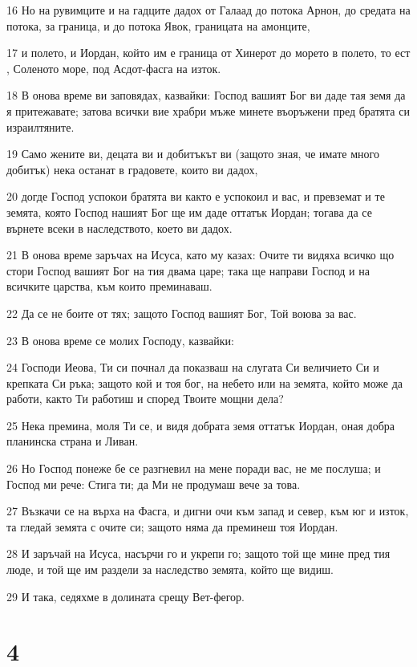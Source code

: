 \par 16 Но на рувимците и на гадците дадох от Галаад до потока Арнон, до средата на потока, за граница, и до потока Явок, границата на амонците,
\par 17 и полето, и Иордан, който им е граница от Хинерот до морето в полето, то ест , Соленото море, под Асдот-фасга на изток.
\par 18 В онова време ви заповядах, казвайки: Господ вашият Бог ви даде тая земя да я притежавате; затова всички вие храбри мъже минете въоръжени пред братята си израилтяните.
\par 19 Само жените ви, децата ви и добитъкът ви (защото зная, че имате много добитък) нека останат в градовете, които ви дадох,
\par 20 догде Господ успокои братята ви както е успокоил и вас, и превземат и те земята, която Господ нашият Бог ще им даде оттатък Иордан; тогава да се върнете всеки в наследството, което ви дадох.
\par 21 В онова време заръчах на Исуса, като му казах: Очите ти видяха всичко що стори Господ вашият Бог на тия двама царе; така ще направи Господ и на всичките царства, към които преминаваш.
\par 22 Да се не боите от тях; защото Господ вашият Бог, Той воюва за вас.
\par 23 В онова време се молих Господу, казвайки:
\par 24 Господи Иеова, Ти си почнал да показваш на слугата Си величието Си и крепката Си ръка; защото кой и тоя бог, на небето или на земята, който може да работи, както Ти работиш и според Твоите мощни дела?
\par 25 Нека премина, моля Ти се, и видя добрата земя оттатък Иордан, оная добра планинска страна и Ливан.
\par 26 Но Господ понеже бе се разгневил на мене поради вас, не ме послуша; и Господ ми рече: Стига ти; да Ми не продумаш вече за това.
\par 27 Възкачи се на върха на Фасга, и дигни очи към запад и север, към юг и изток, та гледай земята с очите си; защото няма да преминеш тоя Иордан.
\par 28 И заръчай на Исуса, насърчи го и укрепи го; защото той ще мине пред тия люде, и той ще им раздели за наследство земята, който ще видиш.
\par 29 И така, седяхме в долината срещу Вет-фегор.

\chapter{4}

